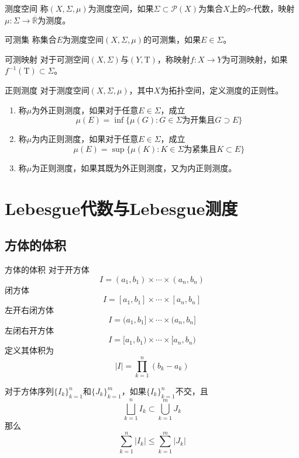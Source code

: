 \documentclass[lang = cn, scheme = chinese, thmcnt = section]{elegantbook}
\newcommand{\R}{\mathbb{R}}            %
\newcommand{\sub}{\subset}             %
\begin{document}
\begin{definition}{测度空间}
	称$(X,\Sigma,\mu)$为测度空间，如果$\Sigma\sub\mathscr{P}(X)$为集合$X$上的$\sigma$-代数，映射$\mu:\Sigma\to \overline{\R}$为测度。
\end{definition}

\begin{definition}{可测集}
	称集合$E$为测度空间$(X,\Sigma,\mu)$的可测集，如果$E\in \Sigma$。
\end{definition}

\begin{definition}{可测映射}
	对于可测空间$(X,\Sigma)$与$(Y,\mathrm{T})$，称映射$f:X\to Y$为可测映射，如果$f^{-1}(\mathrm{T})\sub \Sigma$。
\end{definition}

\begin{definition}{正则测度}
	对于测度空间$(X,\Sigma,\mu)$，其中$X$为拓扑空间，定义测度的正则性。
	\begin{enumerate}
		\item 称$\mu$为外正则测度，如果对于任意$E\in \Sigma$，成立%
		$$
		\mu(E)=\inf\{ \mu(G):G\in\Sigma\text{为开集且}G\supset E \}
		$$
		\item 称$\mu$为内正则测度，如果对于任意$E\in \Sigma$，成立%
		$$
		\mu(E)=\sup\{ \mu(K):K\in\Sigma\text{为紧集且}K\sub E \}
		$$
		\item 称$\mu$为正则测度，如果其既为外正则测度，又为内正则测度。
	\end{enumerate}
\end{definition}

\section{Lebesgue代数与Lebesgue测度}

\subsection{方体的体积}

\begin{definition}{方体的体积}
	对于开方体
	$$
	I=(a_1,b_1)\times\cdots\times(a_n,b_n)
	$$
	闭方体
	$$
	I=[a_1,b_1]\times\cdots\times[a_n,b_n]
	$$
	左开右闭方体
	$$
	I=(a_1,b_1]\times\cdots\times(a_n,b_n]
	$$
	左闭右开方体
	$$
	I=[a_1,b_1)\times\cdots\times[a_n,b_n)
	$$
	定义其体积为
	$$
	|I|=\prod_{k=1}^{n}{(b_k-a_k)}
	$$
\end{definition}

\begin{theorem}
	对于方体序列$\{ I_k \}_{k=1}^{n}$和$\{ J_k \}_{k=1}^{m}$，如果$\{ I_k \}_{k=1}^{n}$不交，且
	$$
	\bigsqcup_{k=1}^{n}{I_k}\sub\bigcup_{k=1}^{m}{J_k}
	$$
	那么
	$$
	\sum_{k=1}^{n}{|I_k|}\le\sum_{k=1}^{m}{|J_k|}
	$$
\end{theorem}
\end{document}
